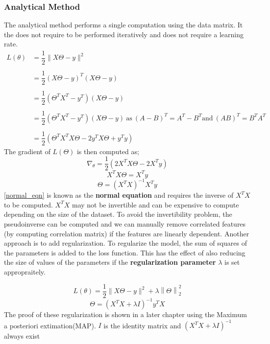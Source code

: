 \documentclass[12pt,a4paper,titlepage,portrait,openany]{book}
\begin{document}
	\subsubsection{Analytical Method}
	The analytical method performs a single computation using the data matrix. It the does not require to be performed iteratively and does not require a learning rate.
	\begin{equation*}
		\begin{array}{cl}
		L(\theta) &= \dfrac{1}{2}\|X\Theta - y\|^2 \\\\
		&= \dfrac{1}{2}(X\Theta - y)^T(X\Theta - y) \\\\
		&= \dfrac{1}{2}(\Theta^{T}X^T - y^T)(X\Theta - y) \\\\
		&= \dfrac{1}{2}(\Theta^{T}X^T - y^T)(X\Theta - y) ~ \text{as} ~ (A - B)^T = A^T - B^T \text{and} ~ (AB)^T = B^TA^T \\\\
		&= \dfrac{1}{2}(\Theta^{T}X^TX\Theta - 2y^TX\Theta + y^Ty)
		\end{array}
	\end{equation*}
	The gradient of $L(\Theta)$ is then computed as;
	\begin{equation*}
		\nabla_\theta = \dfrac{1}{2}\left(2X^TX\Theta - 2X^Ty\right)
	\end{equation*}
	\begin{equation*}
	X^TX\Theta = X^Ty
	\end{equation*}
	\begin{equation}\label{normal_eqn}
	\Theta = \left(X^TX\right)^{-1}X^Ty
	\end{equation}
	\eqref{normal_eqn} is known as the \textbf{normal equation} and requires the inverse of $X^TX$ to be computed. $X^TX$ may not be invertible and can be expensive to compute depending on the size of the dataset. To avoid the invertibility problem, the pseudoinverse can be computed and we can manually remove correlated features (by computing correlation matrix) if the features are linearly dependent. Another approach is to add regularization. To regularize the model, the sum of squares of the parameters is added to the loss function. This has the effect of also reducing the size of values of the parameters if the \textbf{regularization parameter} $\lambda$ is set appropraitely.
	
	
	\begin{equation}
	L(\theta) = \dfrac{1}{2}\|X\Theta - y\|^2 + \lambda\left\|\Theta\right\|_2^2
	\end{equation}
	\begin{equation}
		\Theta = \left(X^TX + \lambda{I}\right)^{-1}y^TX
	\end{equation}
	The proof of these regularization is shown in a later chapter using the Maximum a posteriori extimation(MAP). $I$ is the identity matrix and $\left(X^TX + \lambda{I}\right)^{-1}$ always exist
	
\end{document}
